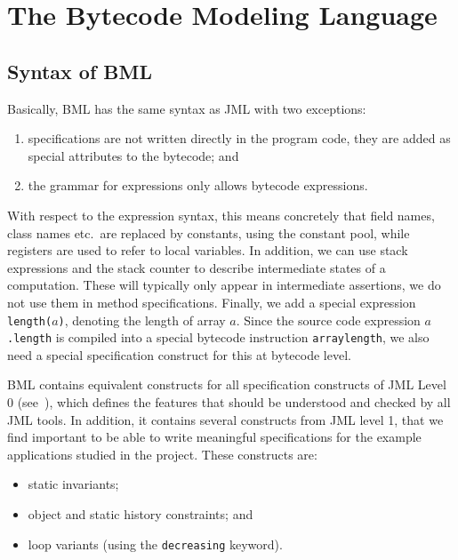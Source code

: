 \section{The Bytecode Modeling Language}
\label{SecBML}


\subsection{Syntax of BML}

Basically, BML has the same syntax as JML with two exceptions:
\begin{enumerate}
\item specifications are not written directly in the program code,
they are added as special attributes to the bytecode; and
\item the grammar for expressions only allows bytecode expressions.
\end{enumerate}

With respect to the expression syntax, this means concretely that
field names, class names etc.\ are replaced by constants, using
the constant pool, while registers are used to refer to local
variables. In addition, we can use stack expressions and the stack
counter to describe intermediate states of a computation. These will
typically only appear in intermediate assertions, we do not use them
in method specifications. Finally, we add a special expression
\texttt{length(\(a\))}, denoting the length of array \(a\). Since the 
source code expression \texttt{\(a\).length} is compiled into a
special bytecode instruction \texttt{arraylength}, we also need a
special specification construct for this at bytecode level.

BML contains equivalent constructs for all specification constructs of
JML Level 0 (see~\cite[\S2.9]{JMLReferenceManual05}), which defines
the features that should be understood and checked by all JML
tools. In addition, it contains several constructs from JML level 1,
that we find important to be able to write meaningful specifications
for the example applications studied in the \mobius project. These
constructs are:
\begin{itemize}
\item static invariants;
\item object and static history constraints; and 
\item loop variants (using the \texttt{decreasing} keyword).
\end{itemize}

